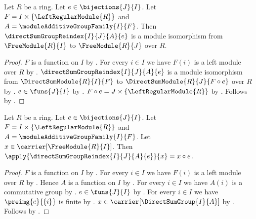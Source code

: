 \begin{theorem}\label{bijective_free_module_reindex_isomorphism}
    Let $R$ be a ring.
    Let $e\in\bijections{J}{I}$.
    Let $F=I\times\{\LeftRegularModule{R}\}$ and
        $A=\moduleAdditiveGroupFamily{I}{F}$.
    Then $\directSumGroupReindex{I}{J}{A}{e}$ is a module isomorphism
        from $\FreeModule{R}{I}$ to $\FreeModule{R}{J}$ over $R$.
\end{theorem}
\begin{proof}
    $F$ is a function on $I$ by
        .
    For every $i\in I$ we have $F(i)$ is a left module over $R$ by
        .
    $\directSumGroupReindex{I}{J}{A}{e}$ is a module isomorphism from
        $\DirectSumModule{R}{I}{F}$ to
        $\DirectSumModule{R}{J}{F\circ e}$ over $R$ by
        .
    $e\in\funs{J}{I}$ by .
    $F\circ e=J\times\{\LeftRegularModule{R}\}$ by
        .
    Follows by .
\end{proof}

\begin{proposition}\label{free_module_reindex_apply}
    Let $R$ be a ring.
    Let $e\in\bijections{J}{I}$.
    Let $F=I\times\{\LeftRegularModule{R}\}$ and
        $A=\moduleAdditiveGroupFamily{I}{F}$.
    Let $x\in\carrier[\FreeModule{R}{I}]$.
    Then
        $\apply{\directSumGroupReindex{I}{J}{A}{e}}{x}=x\circ e$.
\end{proposition}
\begin{proof}
    $F$ is a function on $I$ by
        .
    For every $i\in I$ we have $F(i)$ is a left module over $R$ by
        .
    Hence $A$ is a function on $I$ by
        .
    For every $i\in I$ we have $A(i)$ is a commutative group by
        .
    $e\in\funs{J}{I}$ by .
    For every $i\in I$ we have $\preimg{e}{\{i\}}$ is finite by
        .
    $x\in\carrier[\DirectSumGroup{I}{A}]$ by
        .
    Follows by .
\end{proof}

